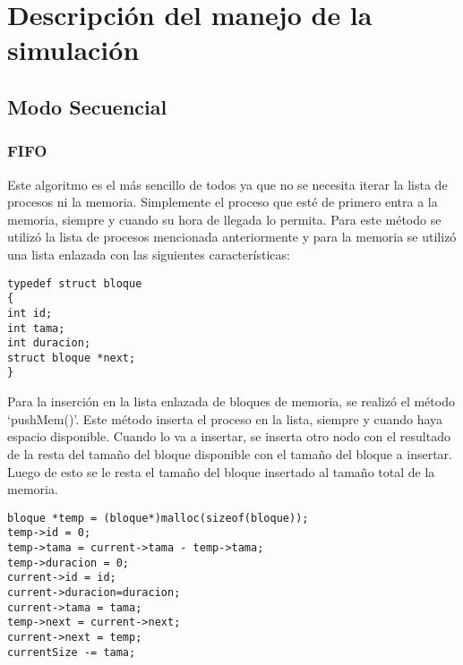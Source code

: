 \documentclass[10pt,a4paper]{article}
\begin{document}
\section{Descripción del manejo de la simulación}
\subsection{Modo Secuencial}
\subsubsection{FIFO}
Este algoritmo es el más sencillo de todos ya que no se necesita iterar la lista de procesos ni la memoria. Simplemente el proceso que esté de primero entra a la memoria, siempre y cuando su hora de llegada lo permita.
Para este método se utilizó la lista de procesos
mencionada anteriormente y para la memoria se utilizó una lista enlazada con las siguientes características:
\begin{verbatim}
typedef struct bloque
{
int id;
int tama;
int duracion;
struct bloque *next;
}
\end{verbatim}
Para la inserción en la lista enlazada de bloques de memoria, se realizó el método `pushMem()'. Este método inserta el proceso en la lista, siempre y cuando haya espacio disponible. Cuando lo va a insertar, se inserta otro nodo con el resultado de la resta del tamaño del bloque disponible con el tamaño del bloque a insertar. Luego de esto se le resta el tamaño del bloque insertado al tamaño total de la memoria.
\begin{verbatim}
bloque *temp = (bloque*)malloc(sizeof(bloque));
temp->id = 0;
temp->tama = current->tama - temp->tama;
temp->duracion = 0;
current->id = id;
current->duracion=duracion;
current->tama = tama;
temp->next = current->next;
current->next = temp;
currentSize -= tama;
\end{verbatim}
\end{document}
